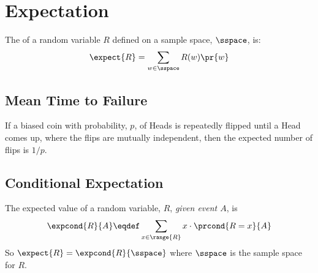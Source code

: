 \documentclass[handout]{mcs}
\begin{document}
\iffalse

\bparts

\ppart Show that if discrete random variables are $k$-wise independent
for $k>2$, they are also $(k-1)$-wise independent.

\solution{Let $X_1,\ldots X_{k-1},X_k$ be any $k$ of the $k$-wise
  independent random variables.  We wish to show that
  $\pr{X_1=i_1,\ldots,X_{k-1} = i_{k-1}} =
  \pr{X_1=i_1}\cdots\pr{X_{k-1} = i_{k-1}}$.  We have
  $\pr{X_1=i_1,\ldots,X_{k-1} = i_{k-1},X_k = i_k} =
  \pr{X_1=i_1}\cdots\pr{X_{k-1} = i_{k-1}}\pr{X_k = i_k}$.  Sum this
  over all values $i_k$ that $X_k$ can take on to get
  \[\pr{X_1=i_1,\ldots,X_{k-1} = i_{k-1}} = \sum_{i_k}
  \pr{X_1=i_1,\ldots,X_{k-1} = i_{k-1},X_k = i_k}\]
  \[ = \sum_{i_k}\pr{X_1=i_1}\cdots\pr{X_{k-1} = i_{k-1}}\pr{X_k =
    i_k}\]
  \[ = \pr{X_1=i_1}\cdots\pr{X_{k-1}\ = i_{k-1}} \sum_{i_k}\pr{X_k =
    i_k}\]
  \[ = \pr{X_1=i_1}\cdots\pr{X_{k-1} = i_{k-1}}.\]
}
\fi

\section{Expectation}
The  of a random variable $R$ defined on a sample
space, $\sspace$, is:
\[
\expect{R} = \sum_{w \in \sspace} R(w) \pr{w}
\]

\iffalse

A 0-1-valued random variable is called an \term{indicator variable}.  If
$I$ is an indicator, then
\[
\expect{I} = \pr{I=1}.
\]

Another helpful formula for expected values is:
\[
\expect{R} = \sum_{x \in \range{R}} x \cdot \pr{R = x}
\]
\fi

\subsection{Mean Time to Failure}

If a biased coin with probability, $p$, of
Heads is repeatedly flipped until a Head comes up, where the flips are
mutually independent, then the expected number of flips is $1/p$.

\subsection{Conditional Expectation}

The expected value of a random variable, $R$, \emph{given event $A$}, is
\[
\expcond{R}{A} \eqdef \sum_{x \in \range{R}} x \cdot \prcond{R = x}{A}
\]
So $\expect{R} = \expcond{R}{\sspace}$ where $\sspace$ is the sample space
for $R$.
\end{document}

